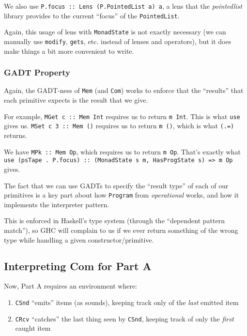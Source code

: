 \documentclass[]{article}
\begin{document}
We also use \texttt{P.focus\ ::\ Lens\textquotesingle{}\ (P.PointedList\ a)\ a},
a lens that the \emph{pointedlist} library provides to the current ``focus'' of
the \texttt{PointedList}.

Again, this usage of lens with \texttt{MonadState} is not exactly necessary (we
can manually use \texttt{modify}, \texttt{gets}, etc. instead of lenses and
operators), but it does make things a bit more convenient to write.

\hypertarget{gadt-property}{%
\subsubsection{GADT Property}\label{gadt-property}}

Again, the GADT-ness of \texttt{Mem} (and \texttt{Com}) works to enforce that
the ``results'' that each primitive expects is the result that we give.

For example, \texttt{MGet\ \textquotesingle{}c\textquotesingle{}\ ::\ Mem\ Int}
requires us to return \texttt{m\ Int}. This is what \texttt{use} gives us.
\texttt{MSet\ \textquotesingle{}c\textquotesingle{}\ 3\ ::\ Mem\ ()} requires us
to return \texttt{m\ ()}, which is what \texttt{(.=)} returns.

We have \texttt{MPk\ ::\ Mem\ Op}, which requires us to return \texttt{m\ Op}.
That's exactly what
\texttt{use\ (psTape\ .\ P.focus)\ ::\ (MonadState\ s\ m,\ HasProgState\ s)\ =\textgreater{}\ m\ Op}
gives.

The fact that we can use GADTs to specify the ``result type'' of each of our
primitives is a key part about how \texttt{Program} from \emph{operational}
works, and how it implements the interpreter pattern.

This is enforced in Haskell's type system (through the ``dependent pattern
match''), so GHC will complain to us if we ever return something of the wrong
type while handling a given constructor/primitive.

\hypertarget{interpreting-com-for-part-a}{%
\subsection{Interpreting Com for Part A}\label{interpreting-com-for-part-a}}

Now, Part A requires an environment where:

\begin{enumerate}
\def\labelenumi{\arabic{enumi}.}
\tightlist
\item
  \texttt{CSnd} ``emits'' items (as sounds), keeping track only of the
  \emph{last} emitted item
\item
  \texttt{CRcv} ``catches'' the last thing seen by \texttt{CSnd}, keeping track
  of only the \emph{first} caught item
\end{enumerate}
\end{document}
